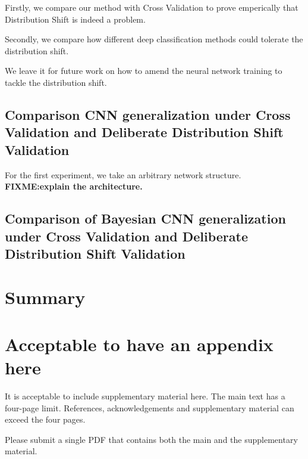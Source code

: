 \documentclass{article}
\begin{document}
Firstly, we compare our method with Cross Validation to prove emperically that Distribution Shift is indeed  a problem.

Secondly, we compare how different deep classification methods could tolerate the distribution shift.

We leave it for future work on how to amend the neural network training to tackle the distribution shift.
\subsection{Comparison CNN generalization under Cross Validation and Deliberate Distribution Shift Validation}
For the first experiment, we take an arbitrary network structure. \textbf{FIXME:explain the architecture.}
\subsection{Comparison of Bayesian CNN generalization under Cross Validation and Deliberate Distribution Shift Validation}
\section{Summary}




\appendix
\section{Acceptable to have an appendix here}
It is acceptable to include supplementary material here. 
The main text has a four-page limit. References, acknowledgements and supplementary material can exceed the four pages. 

Please submit a single PDF that contains both the main and the supplementary material. 
\end{document}
